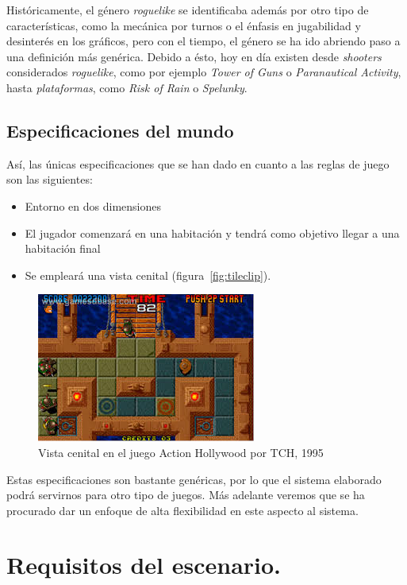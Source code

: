 Históricamente, el género \emph{roguelike} se identificaba además por otro tipo de características, como la mecánica por turnos o el énfasis en jugabilidad y desinterés en los gráficos, pero con el tiempo, el género se ha ido abriendo paso a una definición más genérica. Debido a ésto, hoy en día existen desde \emph{shooters} considerados \emph{roguelike}, como por ejemplo \emph{Tower of Guns} o \emph{Paranautical Activity}, hasta \emph{plataformas}, como \emph{Risk of Rain} o \emph{Spelunky}.

\subsection{Especificaciones del mundo}

Así, las únicas especificaciones que se han dado en cuanto a las reglas de juego son las siguientes:

\begin{itemize}
	\item Entorno en dos dimensiones
	\item El jugador comenzará en una habitación y tendrá como objetivo llegar a una habitación final
	\item Se empleará una vista cenital (figura~\ref{fig:tileclip}).
\end{itemize}

\begin{figure}[t]
\centering
\includegraphics[scale=1]{img/cenital}
\caption{Vista cenital en el juego Action Hollywood por TCH, 1995
\label{fig:cenital}}
\end{figure}

Estas especificaciones son bastante genéricas, por lo que el sistema elaborado podrá servirnos para otro tipo de juegos. Más adelante veremos que se ha procurado dar un enfoque de alta flexibilidad en este aspecto al sistema.

\section{Requisitos del escenario.}

